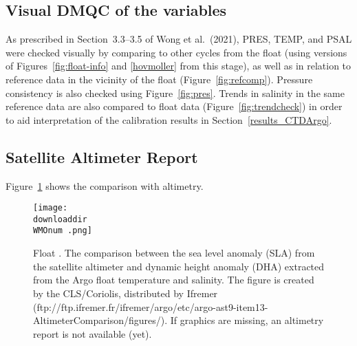 \documentclass{article}
\begin{document}
\newpage
\subsection{Visual DMQC of the variables}
As prescribed in Section~3.3--3.5 of Wong et al.~(2021), PRES, TEMP, and
PSAL were checked visually by comparing to other cycles from the float
(using versions of Figures~\ref{fig:float-info} and \ref{hovmoller} from
this stage), as well as in relation to reference data in the vicinity of
the float (Figure~\ref{fig:refcomp}). Pressure consistency is also checked
using Figure~\ref{fig:pres}.
Trends in salinity in the same
reference data are also compared to float data
(Figure~\ref{fig:trendcheck}) in order to aid interpretation of the
calibration results in Section~\ref{results_CTDArgo}.
%
\begin{figure}[H] 
\end{figure}
%
\begin{figure}[H] 
\end{figure}

 

\newpage
\subsection{Satellite Altimeter Report}
Figure~\ref{Altim} shows the comparison with altimetry.
%
\begin{figure}[H]
  \centering    
  \texttt{[image: \\downloaddir\\WMOnum .png]}
  \caption{Float \WMOnum. The comparison between the sea level anomaly
    (SLA) from the satellite altimeter and dynamic height anomaly (DHA)
    extracted from the Argo float temperature and salinity. The figure is
    created by the CLS/Coriolis, distributed by Ifremer
    (ftp://ftp.ifremer.fr/ifremer/argo/etc/argo-ast9-item13-AltimeterComparison/figures/).
    If graphics are missing, an altimetry report is not available (yet).}
  \label{Altim}
\end{figure}

      
\newpage
\end{document}
